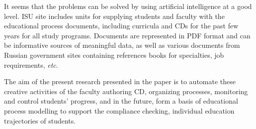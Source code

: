 \documentclass[
]{aiitart}
\begin{document}
It seems that the problems can be solved by using artificial intelligence at a good level.  ISU site includes units for supplying students and faculty with the educational process documents, including curricula and CDs for the past few years for all study programs.  Documents are represented in PDF format and can be informative sources of meaningful data, as well as various documents from Russian government sites containing references books for specialties, job requirements, {\em etc}.





The aim of the present research presented in the paper is to automate these creative activities of the faculty authoring CD, organizing processes, monitoring and control students' progress, and in the future, form a basis of educational process modelling to support the compliance checking, individual education trajectories of students.
\end{document}
